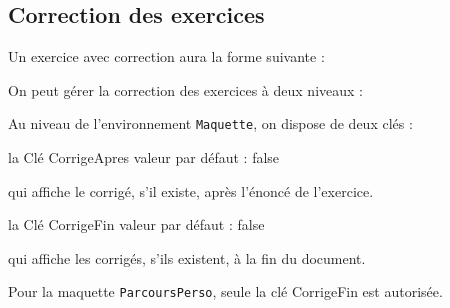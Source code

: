 \documentclass[12pt,french]{article}
\newcommand\Cle[1]{%
  {\sffamily\textlangle #1\textrangle}%
}%
\newcommand{\Defaut}[1]{%
\hfill valeur par défaut : {\sffamily #1}\par%
}%
\newenvironment{Description}
               {\list{}{\labelwidth0pt \leftmargin0pt \itemindent-\leftmargin
                        \let\makelabel\Descriptionlabel}}
               {\endlist}
\newcommand*\Descriptionlabel[1]{\hspace\labelsep
                                \normalfont\bfseries #1}
\begin{document}
\subsection*{\og Correction\fg{} des exercices}
  Un exercice avec correction aura la forme suivante :
  \begin{Codes}{0.4}{}
\begin{exercice}
    
\end{exercice}
\begin{Solution}
  
\end{Solution}
\end{Codes}
On peut gérer la correction des exercices à deux niveaux :
\begin{Description}
  \item[Au niveau de l'environnement ]\lstinline!Maquette!, on dispose de deux clés :
\end{Description}
  \begin{Description}
\item[la Clé \Cle{CorrigeApres}]\Defaut{false}\par qui affiche le corrigé, s'il existe, après l'énoncé de l'exercice.
\item[la Clé \Cle{CorrigeFin}]\Defaut{false}\par qui affiche les corrigés, s'ils existent, à la fin du document.
\end{Description}

Pour la maquette \lstinline!ParcoursPerso!, seule la clé \Cle{CorrigeFin} est autorisée.
\end{document}
